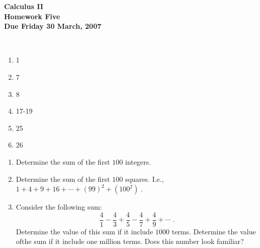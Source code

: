 \documentclass[12pt]{article}
\begin{document}
\pagestyle{empty}
 
\begin{center}
{\large {\bf Calculus II}}\\
\medskip
{\large {\bf Homework Five}}\\
\medskip
{ {\bf Due Friday 30 March, 2007}}\\
\end{center}

\hspace{2mm}\\


\begin{enumerate}
\setlength{\itemsep}{-1mm}
  \item 1
  \item 7
  \item 8
  \item 17-19
  \item 25
  \item 26 

\end{enumerate}


\begin{enumerate}
\setlength{\itemsep}{-1mm}
  \item Determine the sum of the first $100$ integers.  
  \item Determine the sum of the first $100$ squares. I.e., $1 + 4 + 9
  +16 + \cdots + (99)^2 + (100^2) \;$.  
  \item Consider the following sum:
\begin{equation}
  \frac{4}{1} - \frac{4}{3} + \frac{4}{5} - \frac{4}{7} + \frac{4}{9}
  + \cdots \;.
\end{equation} 
Determine the value of this sum if it include $1000$ terms.  Determine
  the value ofthe sum if it include one million terms.  Does this
  number look familiar?
\end{enumerate}
\end{document}
